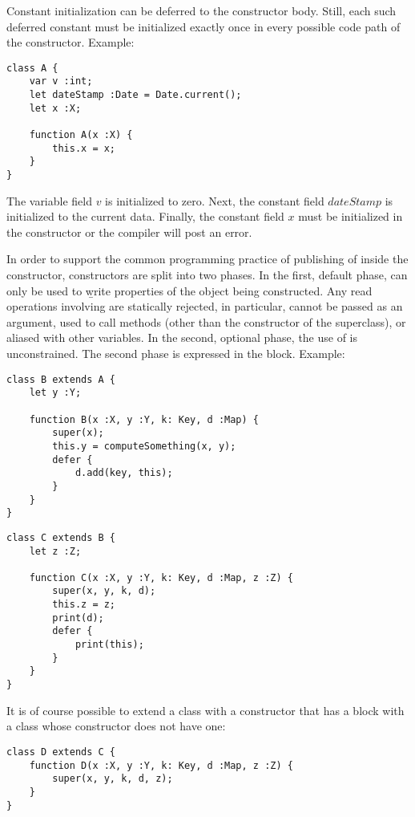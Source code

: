 Constant initialization can be deferred to the constructor body. Still, each
such deferred constant must be initialized exactly once in every possible code
path of the constructor. Example:

\begin{minipage}{\linewidth}
\begin{verbatim}
class A {
    var v :int;
    let dateStamp :Date = Date.current();
    let x :X;

    function A(x :X) {
        this.x = x;
    }
}
\end{verbatim}
\end{minipage}

The variable field $v$ is initialized to zero. Next, the constant field
$dateStamp$ is initialized to the current data. Finally, the constant field $x$
must be initialized in the constructor or the compiler will post an
error.

In order to support the common programming practice of publishing of 
inside the constructor, constructors are split into two phases. In the first,
default phase,  can only be used to {\b write} properties of the
object being constructed. Any read operations involving  are
statically rejected, in particular,  cannot be passed as an argument,
used to call methods (other than the constructor of the superclass), or aliased
with other variables. In the second, optional phase, the use of  is
unconstrained.  The second phase is expressed in the  block.
Example:

\begin{verbatim}
class B extends A {
    let y :Y;

    function B(x :X, y :Y, k: Key, d :Map) {
        super(x);
        this.y = computeSomething(x, y);
        defer {
            d.add(key, this);
        }
    }
}
\end{verbatim}

\begin{verbatim}
class C extends B {
    let z :Z;

    function C(x :X, y :Y, k: Key, d :Map, z :Z) {
        super(x, y, k, d);
        this.z = z;
        print(d);
        defer {
            print(this);
        }
    }
}
\end{verbatim}

It is of course possible to extend a class with a constructor that has a 
block with a class whose constructor does not have one:
\begin{verbatim}
class D extends C {
    function D(x :X, y :Y, k: Key, d :Map, z :Z) {
        super(x, y, k, d, z);
    }
}
\end{verbatim}

